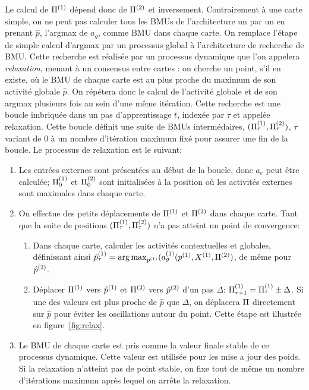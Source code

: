 Le calcul de $\Pi^{({1})}$ dépend donc de $\Pi^{({2})}$ et inversement. Contrairement à une carte simple, on ne peut pas calculer tous les BMUs de l'architecture un par un en prenant $\hat{p}$, l'argmax de $a_g$, comme BMU dans chaque carte.
On remplace l'étape de simple calcul d'argmax par un processus global à l'architecture de recherche de BMU. Cette recherche est réalisée par un processus dynamique que l'on appelera \emph{relaxation}, menant à un consensus entre cartes : on cherche un point, s'il en existe, où le BMU de chaque carte est au plus proche du maximum de son activité globale $\hat{p}$. On répétera donc le calcul de l'activité globale et de son argmax plusieurs fois au sein d'une même itération.
Cette recherche est une boucle imbriquée dans un pas d'apprentissage $t$, indexée par $\tau$ et appelée relaxation. Cette boucle définit une suite de BMUs intermédaires, $(\Pi^{({1})}_\tau , \Pi^{({2})}_\tau)$, $\tau$ variant de $0$ à un nombre d'itération maximum fixé pour assurer une fin de la boucle. Le processus de relaxation est le suivant:
\begin{enumerate}
\item Les entrées externes sont présentées au début de la boucle, donc $a_e$ peut être calculée; $\Pi^{({1})}_0$ et $\Pi^{({2})}_0$ sont initialisées à la position où les activités externes sont maximales dans chaque carte. 
\item On effectue des petits déplacements de $\Pi^{({1})}$ et $\Pi^{({2})}$ dans chaque carte. Tant que la suite de positions $(\Pi^{({1})}_\tau,\Pi^{({2})}_\tau)$ n'a pas atteint un point de convergence:
	\begin{enumerate}
	\item Dans chaque carte, calculer les activités contextuelles et globales, définissant ainsi $\hat{p}^{({1})}_\tau = \operatorname*{arg\,max}_{p^{({1})}}(a_g^{({1})}(p^{({1})},X^{({1})}, \Pi^{({2})})$, de même pour $\hat{p}^{({2})}$.
	\item Déplacer $\Pi^{({1})}$ vers $\hat{p}^{({1})}$ et $\Pi^{({2})}$ vers $\hat{p}^{({2})}$ d'un pas $\Delta$: $\Pi^{({1})}_{\tau+1} = \Pi^{({1})}_{\tau} \pm \Delta$.
	Si une des valeurs est plus proche de $\hat{p}$ que $\Delta$, on déplacera $\Pi$ directement sur $\hat{p}$ pour éviter les oscillations autour du point. Cette étape est illustrée en figure~\ref{fig:relax}.
	\end{enumerate}
\item Le BMU de chaque carte est pris comme la valeur finale stable de ce processus dynamique. Cette valeur est utilisée pour les mise a jour des poids. Si la relaxation n'atteint pas de point stable, on fixe tout de même un nombre d'itérations maximum après lequel on arrête la relaxation.
\end{enumerate}

